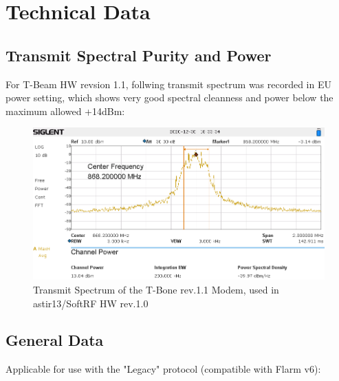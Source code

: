 \documentclass[10pt,a4paper]{article}
\begin{document}
\section{Technical Data}
\subsection{Transmit Spectral Purity and Power}
For T-Beam HW revsion 1.1, follwing transmit spectrum was recorded in EU power setting, which shows very good spectral cleanness and power below the maximum allowed +14dBm:

\begin{figure}[h]
\centering
\includegraphics[scale=.5]{spectrum.png}
\caption{Transmit Spectrum of the T-Bone rev.\/1.1 Modem, used in astir13/SoftRF HW rev.\/1.0}\label{spectrum}
\end{figure}\FloatBarrier


\subsection{General Data}
Applicable for use with the "Legacy" protocol (compatible with Flarm v6):
\end{document}
